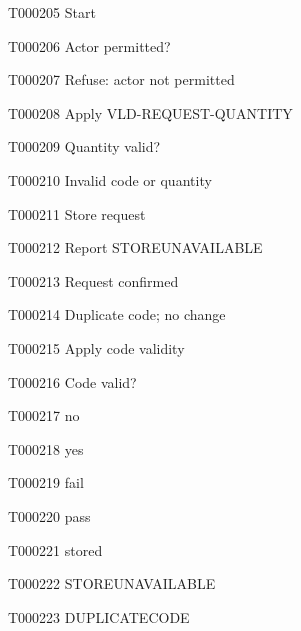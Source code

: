 \documentclass[11pt,a4paper]{article}
\begin{document}
\begin{atlasitem}{T000205}
Start
\end{atlasitem}
\begin{atlasitem}{T000206}
Actor permitted?
\end{atlasitem}
\begin{atlasitem}{T000207}
Refuse: actor not permitted
\end{atlasitem}
\begin{atlasitem}{T000208}
Apply VLD-REQUEST-QUANTITY
\end{atlasitem}
\begin{atlasitem}{T000209}
Quantity valid?
\end{atlasitem}
\begin{atlasitem}{T000210}
Invalid code or quantity
\end{atlasitem}
\begin{atlasitem}{T000211}
Store request
\end{atlasitem}
\begin{atlasitem}{T000212}
Report STORE\AtlasCharUnderscore{}UNAVAILABLE
\end{atlasitem}
\begin{atlasitem}{T000213}
Request confirmed
\end{atlasitem}
\begin{atlasitem}{T000214}
Duplicate code; no change
\end{atlasitem}
\begin{atlasitem}{T000215}
Apply code validity
\end{atlasitem}
\begin{atlasitem}{T000216}
Code valid?
\end{atlasitem}
\begin{atlasitem}{T000217}
no
\end{atlasitem}
\begin{atlasitem}{T000218}
yes
\end{atlasitem}
\begin{atlasitem}{T000219}
fail
\end{atlasitem}
\begin{atlasitem}{T000220}
pass
\end{atlasitem}
\begin{atlasitem}{T000221}
stored
\end{atlasitem}
\begin{atlasitem}{T000222}
STORE\AtlasCharUnderscore{}UNAVAILABLE
\end{atlasitem}
\begin{atlasitem}{T000223}
DUPLICATE\AtlasCharUnderscore{}CODE
\end{atlasitem}
\end{document}
